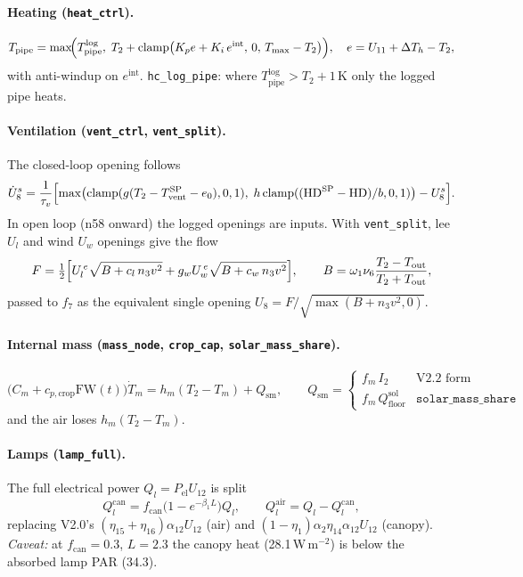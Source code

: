 \documentclass[11pt,a4paper]{article}
\begin{document}
\paragraph{Heating (\texttt{heat\_ctrl}).}
\begin{equation}\label{eq:hc}
T_{\text{pipe}}=\max\!\Bigl(T_{\text{pipe}}^{\log},\;T_2+\mathrm{clamp}\bigl(K_pe+K_i\,e^{\text{int}},\,0,\,T_{\max}-T_2\bigr)\Bigr),\quad
e=U_{11}+\Delta T_h-T_2,
\end{equation}
with anti-windup on $e^{\text{int}}$. \texttt{hc\_log\_pipe}: where $T^{\log}_{\text{pipe}}>T_2+1$\,K only the logged pipe heats.

\paragraph{Ventilation (\texttt{vent\_ctrl}, \texttt{vent\_split}).} The closed-loop opening follows
\begin{equation}\label{eq:vc}
\dot U_8^s=\frac{1}{\tau_v}\Bigl[\max\bigl(\mathrm{clamp}(g(T_2-T_{\text{vent}}^{\text{SP}}-e_0),0,1),\;
h\,\mathrm{clamp}((\mathrm{HD}^{\text{SP}}-\mathrm{HD})/b,0,1)\bigr)-U_8^s\Bigr].
\end{equation}
In open loop (n58 onward) the logged openings are inputs. With \texttt{vent\_split}, lee $U_l$ and wind $U_w$
openings give the flow
\begin{equation}\label{eq:vsplit}
F=\tfrac12\Bigl[U_l^{\,e}\sqrt{B+c_l\,n_3v^2}+g_wU_w^{\,e}\sqrt{B+c_w\,n_3v^2}\Bigr],\qquad
B=\omega_1\nu_6\frac{T_2-T_{\text{out}}}{T_2+T_{\text{out}}},
\end{equation}
passed to $f_7$ as the equivalent single opening $U_8=F/\sqrt{\max(B+n_3v^2,0)}$.

\paragraph{Internal mass (\texttt{mass\_node}, \texttt{crop\_cap}, \texttt{solar\_mass\_share}).}
\begin{equation}\label{eq:mass}
\bigl(C_m+c_{p,\text{crop}}\mathrm{FW}(t)\bigr)\dot T_m=h_m(T_2-T_m)+Q_{\text{sm}},\qquad
Q_{\text{sm}}=\begin{cases}f_m\,I_2 & \text{V2.2 form}\\ f_m\,Q_{\text{floor}}^{\text{sol}} & \texttt{solar\_mass\_share}\end{cases}
\end{equation}
and the air loses $h_m(T_2-T_m)$.

\paragraph{Lamps (\texttt{lamp\_full}).} The full electrical power $Q_l=P_{\text{el}}U_{12}$ is split
\begin{equation}\label{eq:lamp}
Q_l^{\text{can}}=f_{\text{can}}\bigl(1-e^{-\beta_1L}\bigr)Q_l,\qquad Q_l^{\text{air}}=Q_l-Q_l^{\text{can}},
\end{equation}
replacing V2.0's $(\eta_{15}+\eta_{16})\alpha_{12}U_{12}$ (air) and $(1-\eta_1)\alpha_2\eta_{14}\alpha_{12}U_{12}$ (canopy).
\emph{Caveat:} at $f_{\text{can}}=0.3$, $L=2.3$ the canopy heat (28.1\,W\,m$^{-2}$) is below the absorbed lamp PAR (34.3).
\end{document}
